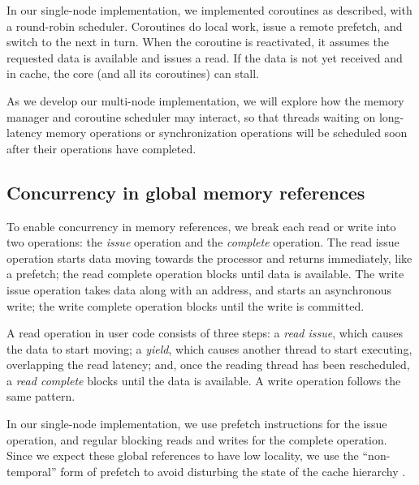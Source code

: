 \documentclass[10pt,nocopyrightspace]{sigplanconf}
\begin{document}
In our single-node implementation, we implemented coroutines
as described, with a round-robin scheduler. Coroutines do local work,
issue a remote prefetch, and switch to the next in turn.  When the
coroutine is reactivated, it assumes the requested data is available
and issues a read.  If the data is not yet received and in cache, the core
(and all its coroutines) can stall.

As we develop our multi-node implementation, we will explore how the memory manager and coroutine scheduler may
interact, so that threads waiting on long-latency memory operations or
synchronization operations will be scheduled soon after their
operations have completed.

\subsection{Concurrency in global memory references}

To enable concurrency in memory references, we break each read or
write into two operations: the {\em issue} operation and the {\em
  complete} operation. The read issue operation starts data moving
towards the processor and returns immediately, like a prefetch; the
read complete operation blocks until data is available. The write
issue operation takes data along with an address, and starts an
asynchronous write; the write complete operation blocks until the
write is committed.

A read operation in user code consists of three steps: a {\em read
  issue}, which causes the data to start moving; a {\em yield}, which
causes another thread to start executing, overlapping the read
latency; and, once the reading thread has been rescheduled, a {\em
  read complete} blocks until the data is available. A write operation
follows the same pattern.

In our single-node implementation, we use prefetch instructions for the issue operation, and regular
blocking reads and writes for the complete operation.  Since we expect
these global references to have low locality, we use the
``non-temporal'' form of prefetch to avoid disturbing the state of the
cache hierarchy \cite{intel:swdev}.
\end{document}
